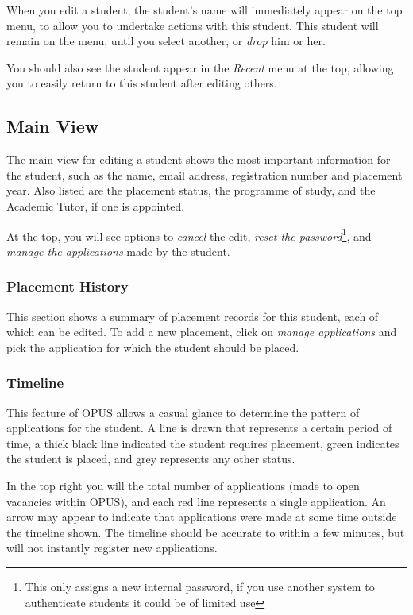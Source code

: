 \documentclass[12 pt]{book}
\begin{document}
When you edit a student, the student's name will immediately appear on the 
top menu, to allow you to undertake actions with this student. This student
will remain on the menu, until you select another, or \emph{drop} him or her.

You should also see the student appear in the \emph{Recent} menu at the top,
allowing you to easily return to this student after editing others.

\subsection{Main View}

The main view for editing a student shows the most important information for
the student, such as the name, email address, registration number and placement
year. Also listed are the placement status, the programme of study, and the
Academic Tutor, if one is appointed.

At the top, you will see options to \emph{cancel} the edit, \emph{reset the
password}\footnote{This only assigns a new internal password, if you use
another system to authenticate students it could be of limited use}, and
\emph{manage the applications} made by the student.

\subsubsection{Placement History}

This section shows a summary of placement records for this student, each of
which can be edited. To add a new placement, click on \emph{manage applications}
and pick the application for which the student should be placed.

\subsubsection{Timeline}

This feature of OPUS allows a casual glance to determine the pattern of
applications for the student. A line is drawn that represents a certain
period of time, a thick black line indicated the student requires placement,
green indicates the student is placed, and grey represents any other 
status.

In the top right you will the total number of applications (made to open
vacancies within OPUS), and each red line represents a single application. An
arrow may appear to indicate that applications were made at some time outside
the timeline shown. The timeline should be accurate to within a few minutes,
but will not instantly register new applications.
\end{document}
